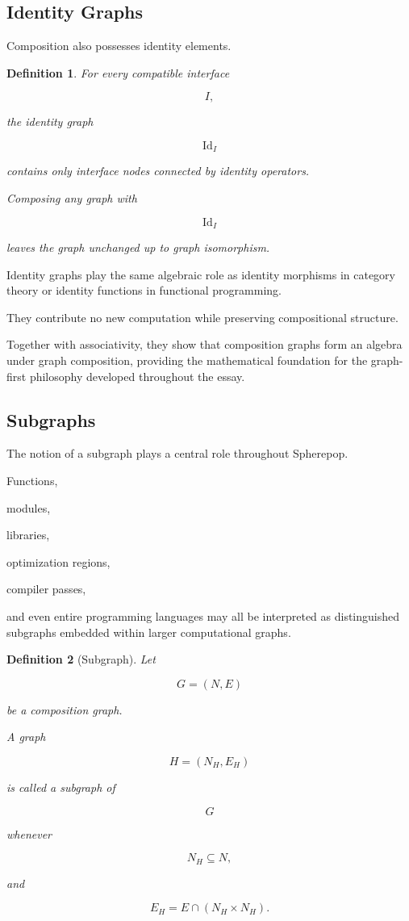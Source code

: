 \documentclass[12pt,oneside]{article}
\newtheorem{definition}{Definition}[section]
\begin{document}
\subsection{Identity Graphs}

Composition also possesses identity elements.

\begin{definition}

For every compatible interface

\[
I,
\]

the identity graph

\[
\operatorname{Id}_I
\]

contains only interface nodes connected by identity operators.

Composing any graph with

\[
\operatorname{Id}_I
\]

leaves the graph unchanged up to graph isomorphism.

\end{definition}

Identity graphs play the same algebraic role as identity morphisms in category theory or identity functions in functional programming.

They contribute no new computation while preserving compositional structure.

Together with associativity, they show that composition graphs form an algebra under graph composition, providing the mathematical foundation for the graph-first philosophy developed throughout the essay.

\subsection{Subgraphs}

The notion of a subgraph plays a central role throughout Spherepop.

Functions,

modules,

libraries,

optimization regions,

compiler passes,

and even entire programming languages may all be interpreted as distinguished subgraphs embedded within larger computational graphs.

\begin{definition}[Subgraph]

Let

\[
G=(N,E)
\]

be a composition graph.

A graph

\[
H=(N_H,E_H)
\]

is called a subgraph of

\[
G
\]

whenever

\[
N_H\subseteq N,
\]

and

\[
E_H
=
E\cap(N_H\times N_H).
\]

\end{definition}
\end{document}
